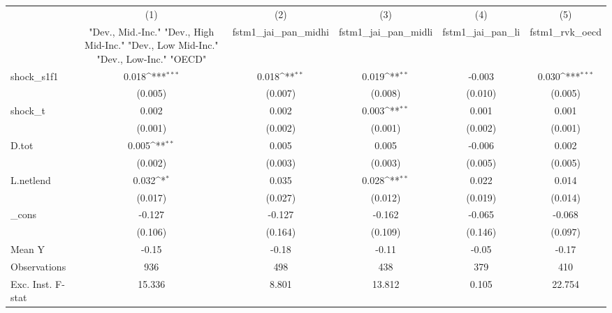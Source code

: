 {
\def\sym#1{\ifmmode^{#1}\else\(^{#1}\)\fi}
\begin{tabular}{l*{5}{c}}
\toprule
            &\multicolumn{1}{c}{(1)}&\multicolumn{1}{c}{(2)}&\multicolumn{1}{c}{(3)}&\multicolumn{1}{c}{(4)}&\multicolumn{1}{c}{(5)}\\
            &\multicolumn{1}{c}{ "Dev., Mid.-Inc." "Dev., High Mid-Inc." "Dev., Low Mid-Inc." "Dev., Low-Inc." "OECD" }&\multicolumn{1}{c}{fstm1\_jai\_pan\_midhi}&\multicolumn{1}{c}{fstm1\_jai\_pan\_midli}&\multicolumn{1}{c}{fstm1\_jai\_pan\_li}&\multicolumn{1}{c}{fstm1\_rvk\_oecd}\\
\midrule
shock\_s1f1  &       0.018\sym{***}&       0.018\sym{**} &       0.019\sym{**} &      -0.003         &       0.030\sym{***}\\
            &     (0.005)         &     (0.007)         &     (0.008)         &     (0.010)         &     (0.005)         \\
\addlinespace
shock\_t     &       0.002         &       0.002         &       0.003\sym{**} &       0.001         &       0.001         \\
            &     (0.001)         &     (0.002)         &     (0.001)         &     (0.002)         &     (0.001)         \\
\addlinespace
D.tot       &       0.005\sym{**} &       0.005         &       0.005         &      -0.006         &       0.002         \\
            &     (0.002)         &     (0.003)         &     (0.003)         &     (0.005)         &     (0.005)         \\
\addlinespace
L.netlend   &       0.032\sym{*}  &       0.035         &       0.028\sym{**} &       0.022         &       0.014         \\
            &     (0.017)         &     (0.027)         &     (0.012)         &     (0.019)         &     (0.014)         \\
\addlinespace
\_cons      &      -0.127         &      -0.127         &      -0.162         &      -0.065         &      -0.068         \\
            &     (0.106)         &     (0.164)         &     (0.109)         &     (0.146)         &     (0.097)         \\
\midrule
Mean Y      &       -0.15         &       -0.18         &       -0.11         &       -0.05         &       -0.17         \\
Observations&         936         &         498         &         438         &         379         &         410         \\
Exc. Inst. F-stat&      15.336         &       8.801         &      13.812         &       0.105         &      22.754         \\
\bottomrule
\end{tabular}
}
